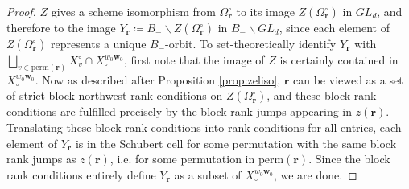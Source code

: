 \documentclass[reqno]{amsart}
\newcommand{\perm}{\textrm{perm}}
\numberwithin{equation}{section}
\theoremstyle{definition}
\theoremstyle{remark}
\begin{document}
\begin{proof}
$Z$ gives a scheme isomorphism from $\Omega^\circ_{\mathbf{r}}$ to its image $Z(\Omega^\circ_{\mathbf{r}})$ in $GL_d$, and therefore to the image $Y_{\mathbf{r}} \coloneqq B_-\backslash Z(\Omega^\circ_{\mathbf{r}})$ in $B_-\backslash GL_d$, since each element of $Z(\Omega^\circ_{\mathbf{r}})$ represents a unique $B_-$-orbit. To set-theoretically identify $Y_{\mathbf{r}}$ with $\bigsqcup_{v \in \perm(\mathbf{r})} X_{v}^\circ \cap X_\circ^{w_0\mathbf{w}_0}$, first note that the image of $Z$ is certainly contained in $X_\circ^{w_0\mathbf{w}_0}$. Now as described after Proposition \ref{prop:zeliso}, $\mathbf{r}$ can be viewed as a set of strict block northwest rank conditions on $Z(\Omega^\circ_{\mathbf{r}})$, and these block rank conditions are fulfilled precisely by the block rank jumps appearing in $z(\mathbf{r})$. Translating these block rank conditions into rank conditions for all entries, each element of $Y_{\mathbf{r}}$ is in the Schubert cell for some permutation with the same block rank jumps as $z(\mathbf{r})$, i.e. for some permutation in $\perm(\mathbf{r})$. Since the block rank conditions entirely define $Y_{\mathbf{r}}$ as a subset of $X_\circ^{w_0\mathbf{w}_0}$, we are done.
\end{proof}
\end{document}
